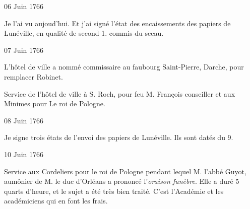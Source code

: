                      \begin{diary}{06 Juin 1766}{}

                         Je l'ai vu aujoud'hui.
                           Et j'ai signé l'état des encaissements des
                           papiers de Lunéville, en
                           qualité de second 1.
                           commis du sceau. \bigskip


                     \end{diary}



                     \begin{diary}{07 Juin 1766}{}


                           L'hôtel de ville a nommé commissaire au
                           faubourg
                              Saint-Pierre, Darche, pour
                           remplacer
                           Robinet. \bigskip


                         Service de l'hôtel de ville à S. Roch, pour
                           feu M. François conseiller
                           et aux Minimes pour Le roi de Pologne. \bigskip


                     \end{diary}

                     \begin{diary}{08 Juin 1766}{}

                         Je signe trois états de l'envoi des papiers
                           de Lunéville. Ils sont datés du 9. \bigskip


                     \end{diary}

                     \begin{diary}{10 Juin 1766}{}

                         Service aux Cordeliers pour le roi de Pologne
                           pendant
                           lequel M. l'abbé Guyot,
                           aumônier de M. le
                              duc d'Orléans a prononcé l'\emph{oraison funèbre}. Elle a
                           duré 5 quarts d'heure, et le sujet a été très
                           bien traité. C'est l'Académie
                           et les académiciens
                           qui en font les frais. \bigskip


                     \end{diary}

